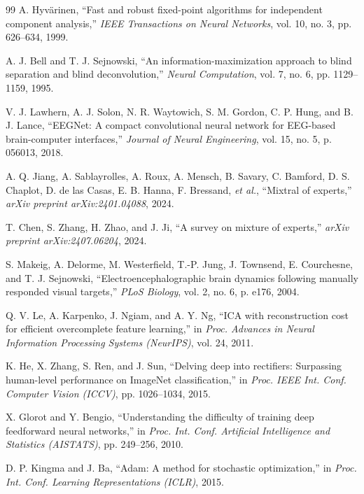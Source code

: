 \documentclass[journal]{IEEEtran}
\begin{document}
\begin{thebibliography}{99}
A. Hyv\"{a}rinen, ``Fast and robust fixed-point algorithms for independent component analysis,'' \textit{IEEE Transactions on Neural Networks}, vol. 10, no. 3, pp. 626--634, 1999.

A. J. Bell and T. J. Sejnowski, ``An information-maximization approach to blind separation and blind deconvolution,'' \textit{Neural Computation}, vol. 7, no. 6, pp. 1129--1159, 1995.

V. J. Lawhern, A. J. Solon, N. R. Waytowich, S. M. Gordon, C. P. Hung, and B. J. Lance, ``EEGNet: A compact convolutional neural network for EEG-based brain-computer interfaces,'' \textit{Journal of Neural Engineering}, vol. 15, no. 5, p. 056013, 2018.

A. Q. Jiang, A. Sablayrolles, A. Roux, A. Mensch, B. Savary, C. Bamford, D. S. Chaplot, D. de las Casas, E. B. Hanna, F. Bressand, \textit{et al.}, ``Mixtral of experts,'' \textit{arXiv preprint arXiv:2401.04088}, 2024.

T. Chen, S. Zhang, H. Zhao, and J. Ji, ``A survey on mixture of experts,'' \textit{arXiv preprint arXiv:2407.06204}, 2024.

S. Makeig, A. Delorme, M. Westerfield, T.-P. Jung, J. Townsend, E. Courchesne, and T. J. Sejnowski, ``Electroencephalographic brain dynamics following manually responded visual targets,'' \textit{PLoS Biology}, vol. 2, no. 6, p. e176, 2004.

Q. V. Le, A. Karpenko, J. Ngiam, and A. Y. Ng, ``ICA with reconstruction cost for efficient overcomplete feature learning,'' in \textit{Proc. Advances in Neural Information Processing Systems (NeurIPS)}, vol. 24, 2011.

K. He, X. Zhang, S. Ren, and J. Sun, ``Delving deep into rectifiers: Surpassing human-level performance on ImageNet classification,'' in \textit{Proc. IEEE Int. Conf. Computer Vision (ICCV)}, pp. 1026--1034, 2015.

X. Glorot and Y. Bengio, ``Understanding the difficulty of training deep feedforward neural networks,'' in \textit{Proc. Int. Conf. Artificial Intelligence and Statistics (AISTATS)}, pp. 249--256, 2010.

D. P. Kingma and J. Ba, ``Adam: A method for stochastic optimization,'' in \textit{Proc. Int. Conf. Learning Representations (ICLR)}, 2015.

\end{thebibliography}
\end{document}
